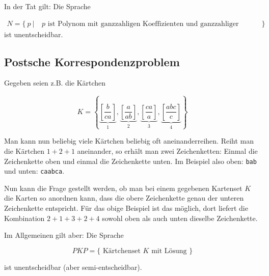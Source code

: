 \documentclass{scrartcl}%
\begin{document}
    \vspace*{0.3cm}
    In der Tat gilt: Die Sprache

    \begin{align*}
        N = \{\ p\ |\ & p \text{ ist Polynom mit ganzzahligen Koeffizienten und ganzzahliger Nullstelle } \}
    \end{align*}
    ist unentscheidbar.

    \subsection*{Postsche Korrespondenzproblem}
    Gegeben seien z.B. die Kärtchen

    \begin{equation*}
        K = \left\{
        \underbrace{\left[ \frac{b}{ca}\right]}_{1},
        \underbrace{\left[ \frac{a}{ab}\right]}_{2},
        \underbrace{\left[ \frac{ca}{a}\right]}_{3},
        \underbrace{\left[ \frac{abc}{c}\right]}_{4}
        \right\}
    \end{equation*}

    Man kann nun beliebig viele Kärtchen beliebig oft aneinanderreihen.
    Reiht man die Kärtchen $1+2+1$ aneinander, so erhält man zwei Zeichenketten: Einmal die Zeichenkette oben und einmal die Zeichenkette unten.
    Im Beispiel also oben: \texttt{bab} und unten: \texttt{caabca}.

    \vspace*{0.3cm}
    Nun kann die Frage gestellt werden, ob man bei einem gegebenen Kartenset $K$ die Karten so anordnen kann,
    dass die obere Zeichenkette genau der unteren Zeichenkette entspricht.
    Für das obige Beispiel ist das möglich, dort liefert die Kombination $2+1+3+2+4$ sowohl oben als auch unten dieselbe Zeichenkette.

    \vspace*{0.3cm}
    Im Allgemeinen gilt aber: Die Sprache

    \begin{equation*}
        PKP = \{ \text{ Kärtchenset } K \text{ mit Lösung } \}
    \end{equation*}

    ist unentscheidbar (aber semi-entscheidbar).
\end{document}
